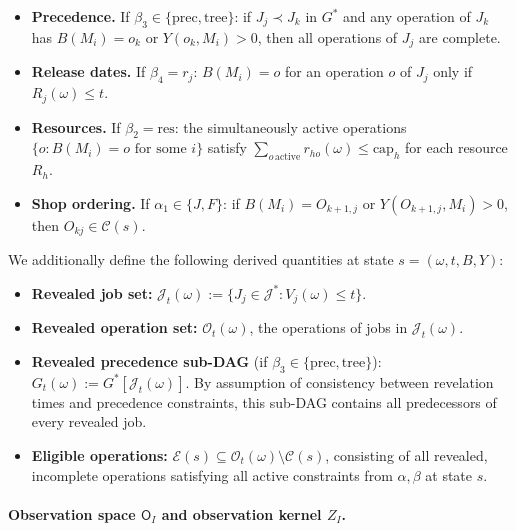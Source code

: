 \begin{itemize}
    \item[\textbf{(F5)}] \textbf{Precedence.} If
    $\beta_3 \in \{\mathrm{prec}, \mathrm{tree}\}$: if $J_j \prec J_k$ in $G^*$ and
    any operation of $J_k$ has $B(M_i) = o_k$ or $Y(o_k, M_i) > 0$, then all
    operations of $J_j$ are complete.

    \item[\textbf{(F6)}] \textbf{Release dates.} If $\beta_4 = r_j$:
    $B(M_i) = o$ for an operation $o$ of $J_j$ only if $R_j(\omega) \le t$.

    \item[\textbf{(F7)}] \textbf{Resources.} If $\beta_2 = \mathrm{res}$: the
    simultaneously active operations $\{o : B(M_i) = o \text{ for some } i\}$ satisfy
    $\sum_{o\,\mathrm{active}} r_{ho}(\omega) \le \mathrm{cap}_h$ for each resource
    $R_h$.

    \item[\textbf{(F8)}] \textbf{Shop ordering.} If $\alpha_1 \in \{J, F\}$: if
    $B(M_i) = O_{k+1,j}$ or $Y(O_{k+1,j}, M_i) > 0$, then $O_{kj} \in \mathcal{C}(s)$.
\end{itemize}

We additionally define the following derived quantities at state
$s = (\omega, t, B, Y)$:
\begin{itemize}
    \item \textbf{Revealed job set:}
    $\mathcal{J}_t(\omega) := \{J_j \in \mathcal{J}^* : V_j(\omega) \le t\}$.
    \item \textbf{Revealed operation set:} $\mathcal{O}_t(\omega)$, the operations of
    jobs in $\mathcal{J}_t(\omega)$.
    \item \textbf{Revealed precedence sub-DAG}
    (if $\beta_3 \in \{\mathrm{prec}, \mathrm{tree}\}$):
    $G_t(\omega) := G^*[\mathcal{J}_t(\omega)]$. By assumption of consistency between revelation times and precedence constraints, this sub-DAG contains all predecessors of every
    revealed job.
    \item \textbf{Eligible operations:}
    $\mathcal{E}(s) \subseteq \mathcal{O}_t(\omega) \setminus \mathcal{C}(s)$,
    consisting of all revealed, incomplete operations satisfying all active constraints
    from $\alpha, \beta$ at state $s$.
\end{itemize}

\paragraph{Observation space $\mathsf{O}_I$ and observation kernel $Z_I$.}

